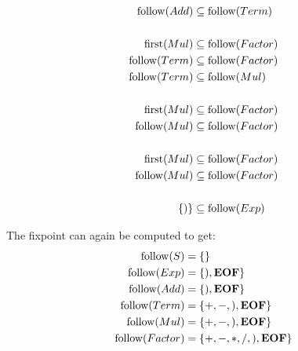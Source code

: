 \begin{exercise}{}
\begin{solution}
\begin{enumerate}
\begin{enumerate}
\begin{multicols}{2}
\begin{align*}
              \operatorname{follow}(Add) &\subseteq \operatorname{follow}(Term) \\
              &\\
              \operatorname{first}(Mul) &\subseteq \operatorname{follow}(Factor) \\
              \operatorname{follow}(Term) &\subseteq \operatorname{follow}(Factor) \\
              \operatorname{follow}(Term) &\subseteq \operatorname{follow}(Mul) \\
              &\\
              \operatorname{first}(Mul) &\subseteq \operatorname{follow}(Factor) \\
              \operatorname{follow}(Mul) &\subseteq \operatorname{follow}(Factor) \\
              &\\
              \operatorname{first}(Mul) &\subseteq \operatorname{follow}(Factor) \\
              \operatorname{follow}(Mul) &\subseteq \operatorname{follow}(Factor) \\
              &\\
              \{)\} &\subseteq \operatorname{follow}(Exp) \\
            \end{align*}
          \end{multicols}

          The fixpoint can again be computed to get:
          \begin{align*}
            \operatorname{follow}(S) &= \{\} \\
            \operatorname{follow}(Exp) &= \{), \mathbf{EOF}\} \\
            \operatorname{follow}(Add) &= \{), \mathbf{EOF}\} \\
            \operatorname{follow}(Term) &= \{+, -, ), \mathbf{EOF}\} \\
            \operatorname{follow}(Mul) &= \{+, -, ), \mathbf{EOF}\} \\
            \operatorname{follow}(Factor) &= \{+, -, *, /, ), \mathbf{EOF}\}
          \end{align*}


\end{enumerate}
\end{enumerate}
\end{solution}
\end{exercise}
